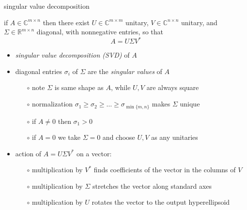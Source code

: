 \documentclass[10pt,hyperref]{beamer}
\newcommand{\CC}{\mathbb{C}}
\newcommand{\RR}{\mathbb{R}}
\begin{document}
\begin{frame}{singular value decomposition}

\begin{theorem}
 if $A\in \CC^{m\times n}$ then there exist $U\in \CC^{m\times m}$ unitary, $V \in \CC^{n\times n}$ unitary, and $\Sigma \in \RR^{m\times n}$ diagonal, with nonnegative entries, so that
    $$A = U \Sigma V^*$$
\end{theorem}

\begin{itemize}
\item \emph{singular value decomposition (SVD)} of $A$
\item diagonal entries $\sigma_i$ of $\Sigma$ are the \emph{singular values} of $A$
    \begin{itemize}
    \item[$\circ$] note $\Sigma$ is same shape as $A$, while $U,V$ are always square
    \item[$\circ$] normalization $\sigma_1\ge \sigma_2 \ge \dots \ge \sigma_{\min\{m,n\}}$ makes $\Sigma$ unique
    \item[$\circ$] if $A\ne 0$ then $\sigma_1>0$
    \item[$\circ$] if $A=0$ we take $\Sigma=0$ and choose $U,V$ as any unitaries
    \end{itemize}
\item action of $A = U \Sigma V^*$ on a vector:
    \begin{itemize}
    \item[$\circ$] multiplication by $V^*$ finds coefficients of the vector in the columns of $V$
    \item[$\circ$] multiplication by $\Sigma$ stretches the vector along standard axes
    \item[$\circ$] multiplication by $U$ rotates the vector to the output hyperellipsoid
    \end{itemize}
\end{itemize}
\end{frame}
\end{document}
